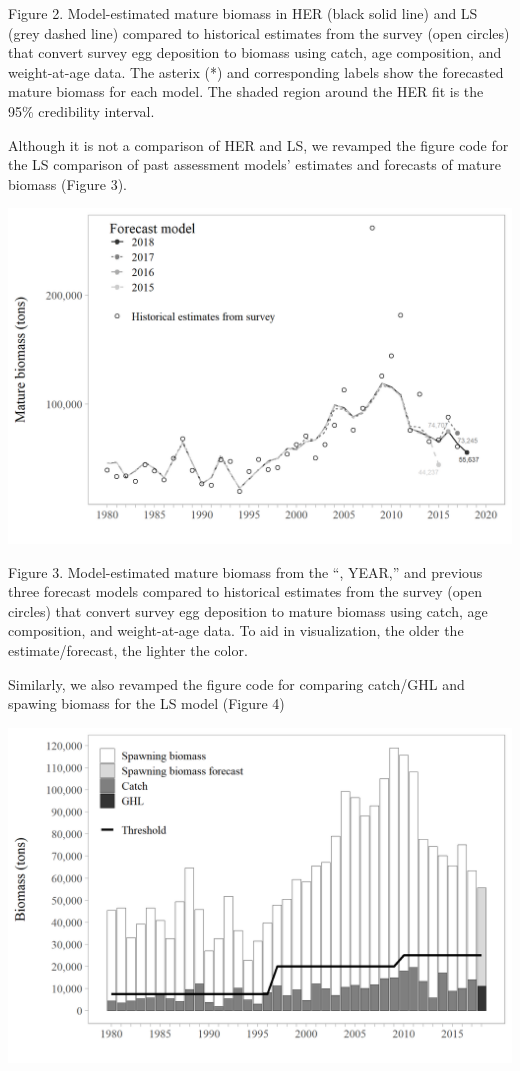 \documentclass[]{article}
\begin{document}
Figure 2. Model-estimated mature biomass in HER (black solid line) and
LS (grey dashed line) compared to historical estimates from the survey
(open circles) that convert survey egg deposition to biomass using
catch, age composition, and weight-at-age data. The asterix (*) and
corresponding labels show the forecasted mature biomass for each model.
The shaded region around the HER fit is the 95\% credibility interval.

Although it is not a comparison of HER and LS, we revamped the figure
code for the LS comparison of past assessment models' estimates and
forecasts of mature biomass (Figure 3).

\includegraphics[width=1\linewidth]{../../HER/figs/LS/compare_past_matbio}

Figure 3. Model-estimated mature biomass from the ``, YEAR,'' and
previous three forecast models compared to historical estimates from the
survey (open circles) that convert survey egg deposition to mature
biomass using catch, age composition, and weight-at-age data. To aid in
visualization, the older the estimate/forecast, the lighter the color.

Similarly, we also revamped the figure code for comparing catch/GHL and
spawing biomass for the LS model (Figure 4)

\includegraphics{../../HER/figs/LS/biomasscatch_barplot.png}
\end{document}

